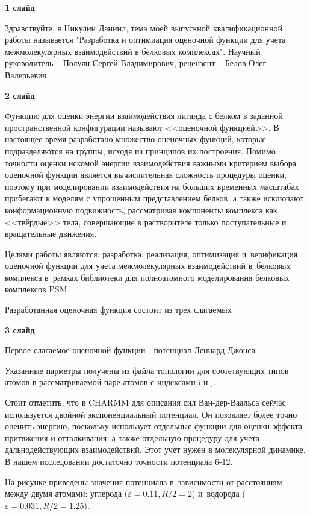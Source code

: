 \documentclass[30pt]{article}
\begin{document}
\textbf{1 слайд}

Здравствуйте, я Никулин Даниил, тема моей выпускной квалификационной работы называется "Разработка и оптимиация оценочной функции для учета межмолекулярных взаимодействий в белковых комплексах". Научный руководитель -- Полуян Сергей Владимирович, рецензент -- Белов Олег Валерьевич.

\vspace{+5mm}


\textbf{2 слайд}

Функцию для оценки энергии взаимодействия лиганда с белком в заданной пространственной конфигурации называют <<оценочной функцией>>. В настоящее время разработано множество оценочных функций, которые подразделяются на группы, исходя из принципов их построения. Помимо точности оценки искомой энергии взаимодействия важными критерием выбора оценочной функции является вычислительная сложность процедуры оценки, поэтому при моделировании взаимодействия на больших временных масштабах прибегают к моделям с упрощенным представлением белков, а также исключают конформационную подвижность, рассматривая компоненты комплекса как <<твёрдые>> тела, совершающие в растворителе только поступательные и вращательные движения.

Целями работы являются: разработка, реализация, оптимизация и~верификация оценочной функции для учета межмолекулярных взаимодействий в~белковых комплекса в~рамках библиотеки для полноатомного моделирования белковых комплексов PSM

Разработанная оценочная функция состоит из трех слагаемых

\vspace{+5mm}


\textbf{3 слайд}

Первое слагаемое оценочной функции - потенциал Леннард-Джонса

Указанные парметры получены из файла топологии для соотетвующих типов атомов в рассматриваемой паре атомов с индексами i и j.

Стоит отметить, что в CHARMM для описания сил Ван-дер-Ваальса сейчас используется двойной экспоненциальный потенциал. Он позовляет более точно оценить энергию, поскольку использует отдельные функции для оценки эффекта притяжения и отталкивания, а также отдельную процедуру для учета дальнодействующих взаимодействий. Этот учет нужен в молекулярной динамике. В нашем исследовании достаточно точности потенциала 6-12.

На рисунке приведены значения потенциала в~зависимости от расстояниям между двумя атомами: углерода ($\varepsilon=0.11, R/2 = 2$) и~водорода ($\varepsilon=0.031, R/2 = 1.25$).
\end{document}
